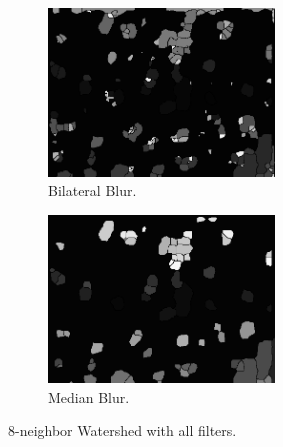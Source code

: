 \documentclass{article}
\begin{document}
\begin{figure}[H]
\centering
\begin{subfigure}{6cm}
  \centering
  \includegraphics[width=6cm]{experiments/nuclei/finalBilateral_nucleiseg.png}
  \caption{Bilateral Blur.}
\end{subfigure}    
\begin{subfigure}{6cm}
  \centering
  \includegraphics[width=6cm]{experiments/nuclei/finalMedian_nucleiseg.png}
  \caption{Median Blur.}
\end{subfigure}
\caption{8-neighbor Watershed with all filters.}
\label{fig:nuclei_threshFinal}
\end{figure}
\end{document}
